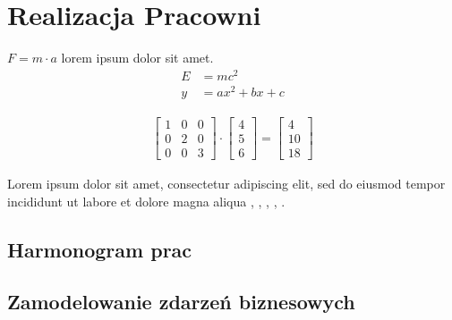 \clearpage %
\section{Realizacja Pracowni}

\lipsum[2] $F = m \cdot a$ lorem ipsum dolor sit amet.
\begin{align*}
    E & = mc^2 \\
    y & = ax^2 + bx + c
\end{align*}

\lipsum[3]
\begin{align}
    \begin{bmatrix}
        1 & 0 & 0 \\
        0 & 2 & 0 \\
        0 & 0 & 3
    \end{bmatrix} \cdot
    \begin{bmatrix}
        4 \\
        5 \\
        6
    \end{bmatrix} =
    \begin{bmatrix}
        4  \\
        10 \\
        18
    \end{bmatrix}
\end{align}

\lipsum[4] Lorem ipsum dolor sit amet, consectetur adipiscing elit, sed do eiusmod tempor incididunt ut labore et dolore magna aliqua \cite{szczypiorski2015}, \cite{duqu2011}, \cite{shs2015}, \cite{wozniak2018}, \cite{dcp19}.

\subsection{Harmonogram prac}
\kant[1]

\subsection{Zamodelowanie zdarzeń biznesowych}
\kant[1]

